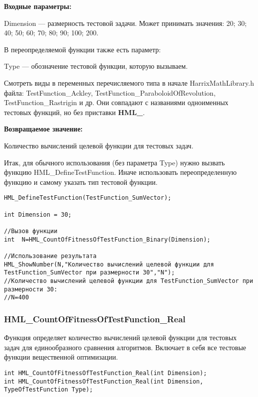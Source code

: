 \documentclass[a4paper,12pt]{article}
\begin{document}
\textbf{Входные параметры:}

Dimension --- размерность тестовой задачи. Может принимать значения: 20; 30; 40; 50; 60; 70; 80; 90; 100; 200.

В переопределяемой функции также есть параметр:
  
Type --- обозначение тестовой функции, которую вызываем. 

Смотреть виды в переменных перечисляемого типа в начале HarrixMathLibrary.h файла: TestFunction\_Ackley, TestFunction\_ParaboloidOfRevolution, TestFunction\_Rastrigin и др. Они совпадают с названиями одноименных тестовых функций, но без приставки \textbf{HML\_}.

\textbf{Возвращаемое значение:}
 
Количество вычислений целевой функции для тестовых задач.

Итак, для обычного использования (без параметра Type) нужно вызвать функцию HML\_DefineTestFunction. Иначе использовать переопределенную функцию и самому указать тип тестовой функции.


\begin{lstlisting}[label=code_use_HML_CountOfFitnessOfTestFunction_Binary,caption=Пример использования]
HML_DefineTestFunction(TestFunction_SumVector);

int Dimension = 30;

//Вызов функции
int  N=HML_CountOfFitnessOfTestFunction_Binary(Dimension);

//Использование результата
HML_ShowNumber(N,"Количество вычислений целевой функции для TestFunction_SumVector при размерности 30","N");
//Количество вычислений целевой функции для TestFunction_SumVector при размерности 30:
//N=400
\end{lstlisting}

\subsubsection{HML\_CountOfFitnessOfTestFunction\_Real}\label{HML_CountOfFitnessOfTestFunction_Real}

Функция определяет количество вычислений целевой функции для тестовых задач для единообразного сравнения алгоритмов. Включает в себя все тестовые функции вещественной оптимизации.


\begin{lstlisting}[label=code_syntax_HML_CountOfFitnessOfTestFunction_Real,caption=Синтаксис]
int HML_CountOfFitnessOfTestFunction_Real(int Dimension);
int HML_CountOfFitnessOfTestFunction_Real(int Dimension, TypeOfTestFunction Type);
\end{lstlisting}
\end{document}
